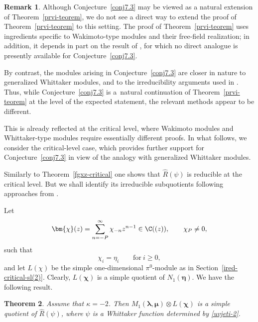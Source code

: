 \documentclass[10pt,a4paper]{amsart}
\numberwithin{equation}{section}
\newtheorem{Theorem}{Theorem}[section]
\theoremstyle{definition}
\newtheorem{Remark}[Theorem]{Remark}
\newcommand{\1}{\textbf{1}}
\begin{document}
 \begin{Remark}
Although Conjecture~\ref{conj7.3} may be viewed as a natural extension of Theorem~\ref{prvi-teorem}, we do not see a direct way to extend the proof of Theorem~\ref{prvi-teorem} to this setting. The proof of Theorem~\ref{prvi-teorem} uses ingredients specific to Wakimoto-type modules and their free-field realization; in addition, it depends in part on the result of \cite{FGXZ}, for which no direct analogue is presently available for Conjecture~\ref{conj7.3}.


By contrast, the modules arising in Conjecture~\ref{conj7.3} are closer in nature to generalized Whittaker modules, and to the irreducibility arguments used in \cite{ALZ-16}. Thus, while Conjecture~\ref{conj7.3} is a~natural continuation of Theorem~\ref{prvi-teorem} at the level of the expected statement, the relevant methods appear to be different.


This is already reflected at the critical level, where Wakimoto modules and Whittaker-type modules require essentially different proofs. In what follows, we consider the critical-level case, which provides further support for Conjecture~\ref{conj7.3} in view of the analogy with generalized Whittaker modules. \end{Remark}

 Similarly to Theorem~\ref{fgxz-critical} one shows that $ \widehat{R}(\psi)$ is reducible at the critical level. But we shall identify its irreducible subquotients following approaches from \cite{A-14, ALZ-16}.

 Let
 \[ \bm{\chi}(z) = \sum_{n =-P } ^{\infty} \chi_{-n} z^{n-1} \in {\C}((z)), \qquad \chi_P \ne 0, \]
 such that
 \[ \chi_i = \eta_i \qquad \mbox{for} \ i \ge 0, \]
 and let $L(\chi)$ be the simple one-dimensional $\pi^0$-module as in Section~\ref{ired-critical-sl(2)}. Clearly, $L(\bm{\chi})$ is a simple quotient of $N_1 (\bm{\eta})$.
We have the following result.

\begin{Theorem} Assume that $\kappa =-2$. Then $M_1 (\bm{\lambda}, \bm{\mu}) \otimes L (\bm{\chi})$ is a simple quotient of $\widehat{R}(\psi)$, where $\psi$ is a Whittaker function determined by \eqref{uvjeti-2}.
 \end{Theorem}
\end{document}
